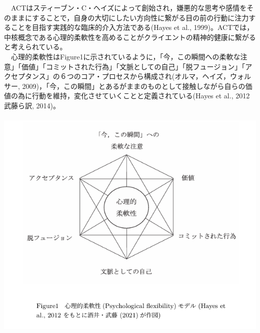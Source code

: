 \documentclass[12pt,a4paper,xelatex,ja=standard]{bxjsarticle}
\begin{document}
　ACTはスティーブン・C・ヘイズによって創始され，嫌悪的な思考や感情をそのままにすることで，自身の大切にしたい方向性に繋がる目の前の行動に注力することを目指す実践的な臨床的介入方法である(Hayes
et al.,
1999)。ACTでは，中核概念である心理的柔軟性を高めることがクライエントの精神的健康に繋がると考えられている。\\
　心理的柔軟性はFigure1に示されているように，「今，この瞬間への柔軟な注意」「価値」「コミットされた行為」「文脈としての自己」「脱フュージョン」「アクセプタンス」の６つのコア・プロセスから構成され(オルマ，ヘイズ，ウォルサー,
2009)，「今，この瞬間」とあるがままのものとして接触しながら自らの価値の為に行動を維持，変化させていくことと定義されている(Hayes
et al., 2012 武藤ら訳, 2014)。\\
　\includegraphics{ACT2.png}
\end{document}
